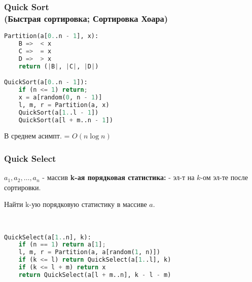 \subsubsection{Quick Sort \\ (Быстрая сортировка; Сортировка Хоара)}
\lstset{style=mystyle}
\begin{lstlisting}[language=Python, caption=Quick Sort]
Partition(a[0..n - 1], x):
    B =>  < x
    C =>  = x
    D =>  > x
    return (|B|, |C|, |D|)

QuickSort(a[0..n - 1]):
    if (n <= 1) return;
    x = a[random(0, n - 1)]
    l, m, r = Partition(a, x)
    QuickSort(a[1..l - 1])
    QuickSort(a[l + m..n - 1])
\end{lstlisting}
\begin{theorem}
В среднем асимпт. = $O(n \log n)$
\end{theorem}
\subsubsection{Quick Select}
\begin{definition}
$a_1, a_2, \ldots, a_n$ - массив
\textbf{k-ая порядковая статистика:} - эл-т на $k$-ом эл-те после сортировки.
\end{definition}
\begin{task}
Найти k-ую порядковую статистику в массиве $a$.
\end{task}
\begin{solution}
    ~\newline
    
\lstset{style=mystyle}
\begin{lstlisting}[language=Python, caption=QuickSelect]
QuickSelect(a[1..n], k):
    if (n == 1) return a[1];
    l, m, r = Partition(a, a[random(1, n)])
    if (k <= l) return QuickSelect(a[1..l], k)
    if (k <= l + m) return x
    return QuickSelect(a[l + m..n], k - l - m)
\end{lstlisting}
\end{solution}
